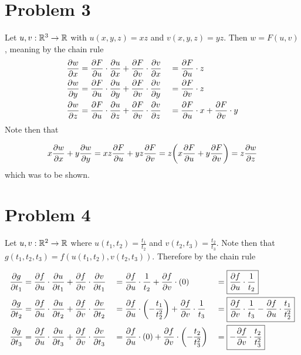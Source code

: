 \documentclass{eeleyes}
\begin{document}
\section*{Problem 3}
Let $u, v : \mathbb{R}^3 \to \mathbb{R}$ with $u(x,y,z) = xz$ and $v(x,y,z) = yz$. Then $w = F(u,v)$, meaning by the chain rule
{\setlength{\jot}{20pt}
\begin{alignat*}{3}
    \pdv{w}{x} &= \pdv{F}{u} \cdot \pdv{u}{x} + \pdv{F}{v} \cdot \pdv{v}{x} &&= \pdv{F}{u} \cdot z \\
    \pdv{w}{y} &= \pdv{F}{u} \cdot \pdv{u}{y} + \pdv{F}{v} \cdot \pdv{v}{y} &&= \pdv{F}{v} \cdot z \\
    \pdv{w}{z} &= \pdv{F}{u} \cdot \pdv{u}{z} + \pdv{F}{v} \cdot \pdv{v}{z} &&= \pdv{F}{u} \cdot x + \pdv{F}{v} \cdot y
\end{alignat*}}
Note then that

\[
    x \pdv{w}{x} + y \pdv{w}{y} = xz \pdv{F}{u} + yz \pdv{F}{v} = z\qty(x \pdv{F}{u} + y \pdv{F}{v}) = z \pdv{w}{z}
\]
which was to be shown.

\section*{Problem 4}
Let $u,v : \mathbb{R}^2 \to \mathbb{R}$ where $u(t_1, t_2) = \frac{t_1}{t_2}$ and $v(t_2, t_3) = \frac{t_2}{t_3}$. Note then that $g(t_1, t_2, t_3) = f(u(t_1,t_2), v(t_2,t_3))$. Therefore by the chain rule

{\setlength{\jot}{20pt}\allowdisplaybreaks
\begin{alignat*}{5}
    \pdv{g}{t_1} &= \pdv{f}{u} \cdot \pdv{u}{t_1} + \pdv{f}{v} \cdot \pdv{v}{t_1} &&= \pdv{f}{u} \cdot \frac{1}{t_2} + \pdv{f}{v} \cdot (0) &&= \boxed{\pdv{f}{u} \cdot \frac{1}{t_2}} \\
    \pdv{g}{t_2} &= \pdv{f}{u} \cdot \pdv{u}{t_2} + \pdv{f}{v} \cdot \pdv{v}{t_2} &&= \pdv{f}{u} \cdot \qty(-\frac{t_1}{t_2^2}) + \pdv{f}{v} \cdot \frac{1}{t_3} &&= \boxed{\pdv{f}{v} \cdot \frac{1}{t_3} - \pdv{f}{u} \cdot \frac{t_1}{t_2^2}}\\
    \pdv{g}{t_3} &= \pdv{f}{u} \cdot \pdv{u}{t_3} + \pdv{f}{v} \cdot \pdv{v}{t_3} &&= \pdv{f}{u} \cdot (0) + \pdv{f}{v} \cdot \qty(-\frac{t_2}{t_3^2}) &&= \boxed{-\pdv{f}{v} \cdot \frac{t_2}{t_3^2}}
\end{alignat*}}
\end{document}
